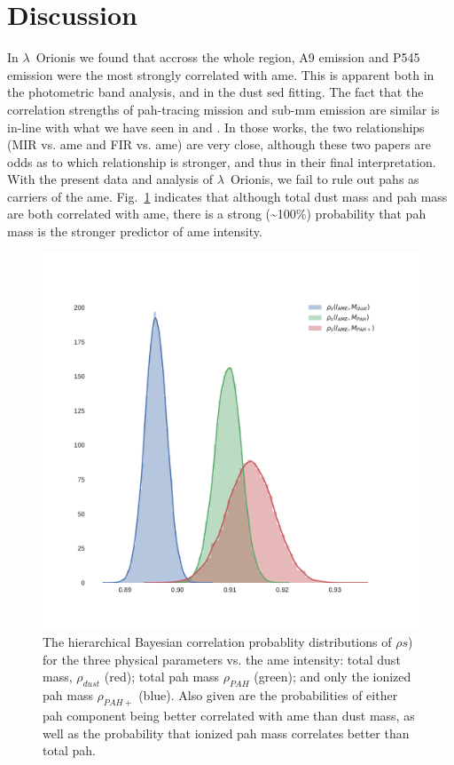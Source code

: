   \section{Discussion}
  \label{sec:lori_discussion}
      In  $\lambda$~Orionis we found that accross the whole region, A9 emission and P545 emission were the most strongly correlated with \acrshort{ame}. This is apparent both in the photometric band analysis, and in the dust \acrshort{sed} fitting.  The fact that the correlation strengths of \acrshort{pah}-tracing mission and sub-mm emission are similar is in-line with what we have seen in \cite{ysard10b} and \cite{hensley16}. In those works, the two relationships (MIR vs. \acrshort{ame} and FIR vs. \acrshort{ame}) are very close, although these two papers are odds as to which relationship is stronger, and thus in their final interpretation. With the present data and analysis of $\lambda$~Orionis, we fail to rule out \acrshort{pah}s as carriers of the \acrshort{ame}. Fig.~\ref{fig:PDFs_Iame} indicates that although total dust mass and \acrshort{pah} mass are both correlated with \acrshort{ame}, there is a strong (\textasciitilde{}100\%) probability that \acrshort{pah} mass is the stronger predictor of \acrshort{ame} intensity.
          \begin{figure}
            \includegraphics[width=\textwidth]{../Plots/ch_lori/PDFs_Iame.pdf}
            \centering
            \caption{ The hierarchical Bayesian correlation probablity distributions of $\rho{s}$) for the three physical parameters vs. the \acrshort{ame} intensity: total dust mass, $\rho_{dust}$ (red); total \acrshort{pah} mass $\rho_{PAH}$ (green); and only the ionized \acrshort{pah} mass $\rho_{PAH+}$ (blue). Also given are the probabilities of either \acrshort{pah} component being better correlated with \acrshort{ame} than dust mass, as well as the probability that ionized \acrshort{pah} mass correlates better than total \acrshort{pah}.}
            \label{fig:PDFs_Iame}
          \end{figure}
